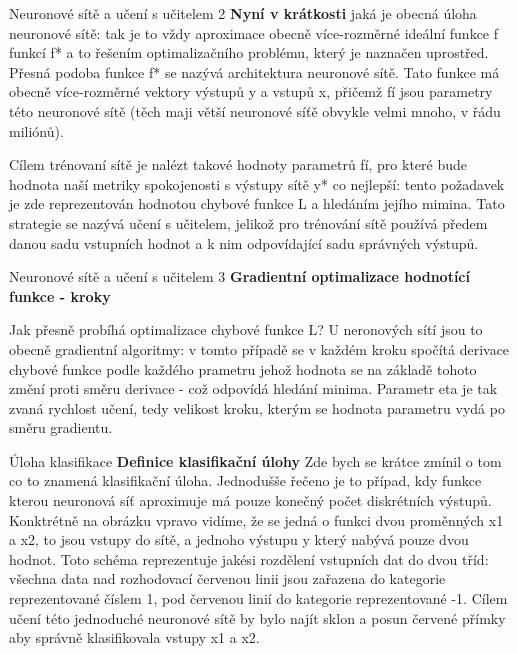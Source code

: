 \documentclass[aspectratio=1610]{beamer}
\begin{document}
\begin{frame}{Neuronové sítě a učení s učitelem 2}
\textbf{Nyní v krátkosti} jaká je obecná úloha neuronové sítě: tak je to vždy aproximace obecně více-rozměrné ideální funkce f funkcí f* a to řešením optimalizačního problému, který je naznačen uprostřed. Přesná podoba funkce f* se nazývá architektura neuronové sítě. Tato funkce má obecně více-rozměrné vektory výstupů y a vstupů x, přičemž fí jsou parametry této neuronové sítě (těch maji větší neuronové síťě obvykle velmi mnoho, v řádu miliónů). 

Cílem trénovaní sítě je nalézt takové hodnoty parametrů fí, pro které bude hodnota naší metriky spokojenosti s výstupy sítě y* co nejlepší: tento požadavek je zde reprezentován hodnotou chybové funkce L a hledáním jejího mimina. Tato strategie se nazývá učení s učitelem, jelikož pro trénování sítě používá předem danou sadu vstupních hodnot a k nim odpovídající sadu správných výstupů.
\end{frame}
\begin{frame}{Neuronové sítě a učení s učitelem 3}
\textbf{Gradientní optimalizace hodnotící funkce - kroky}

Jak přesně probíhá optimalizace chybové funkce L? U neronových sítí jsou to obecně gradientní algoritmy: v tomto případě se v každém kroku spočítá derivace chybové funkce podle každého prametru jehož hodnota se na základě tohoto změní proti směru derivace - což odpovídá hledání minima. Parametr eta je tak zvaná rychlost učení, tedy velikost kroku, kterým se hodnota parametru vydá po směru gradientu.
\end{frame}
\begin{frame}{Úloha klasifikace}
\textbf{Definice klasifikační úlohy}
Zde bych se krátce zmínil o tom co to znamená klasifikační úloha. Jednodušše řečeno je to případ, kdy funkce kterou neuronová síť aproximuje má pouze konečný počet diskrétních výstupů. Konktrétně na obrázku vpravo vidíme, že se jedná o funkci dvou proměnných x1 a x2, to jsou vstupy do sítě, a jednoho výstupu y který nabývá pouze dvou hodnot. Toto schéma reprezentuje jakési rozdělení vstupních dat do dvou tříd: všechna data nad rozhodovací červenou linii jsou zařazena do kategorie reprezentované číslem 1, pod červenou linií do kategorie reprezentované -1. Cílem učení této jednoduché neuronové sítě by bylo najít sklon a posun červené přímky aby správně klasifikovala vstupy x1 a x2.	
\end{frame}
\end{document}

